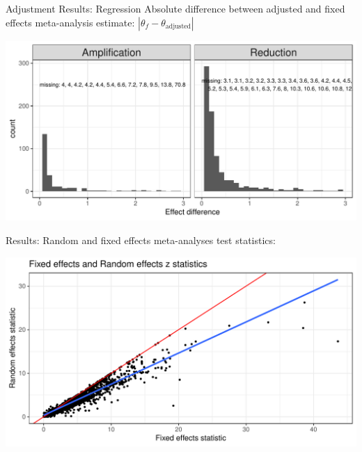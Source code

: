\documentclass[english]{beamer}\usepackage[]{graphicx}\usepackage[]{color}
\makeatletter
\def\maxwidth{ %
  \ifdim\Gin@nat@width>\linewidth
    \linewidth
  \else
    \Gin@nat@width
  \fi
}
\newenvironment{knitrout}{}{} %
\makeatother
\begin{document}
\begin{frame}[fragile]{Adjustment Results: Regression}
Absolute difference between adjusted and fixed effects meta-analysis estimate: $|{\theta_f} - {\theta_{\textrm{adjusted}}}|$

\vspace{-3mm}
\begin{knitrout}
\color{fgcolor}
\includegraphics[width=\maxwidth]{figure/unnamed-chunk-14-1} 

\end{knitrout}
\end{frame}


\begin{frame}[fragile]{Results:}
Random and fixed effects meta-analyses test statistics:

\vspace{-3mm} 
\begin{knitrout}
\color{fgcolor}
\includegraphics[width=\maxwidth]{figure/unnamed-chunk-15-1} 

\end{knitrout}
\end{frame}
\end{document}
